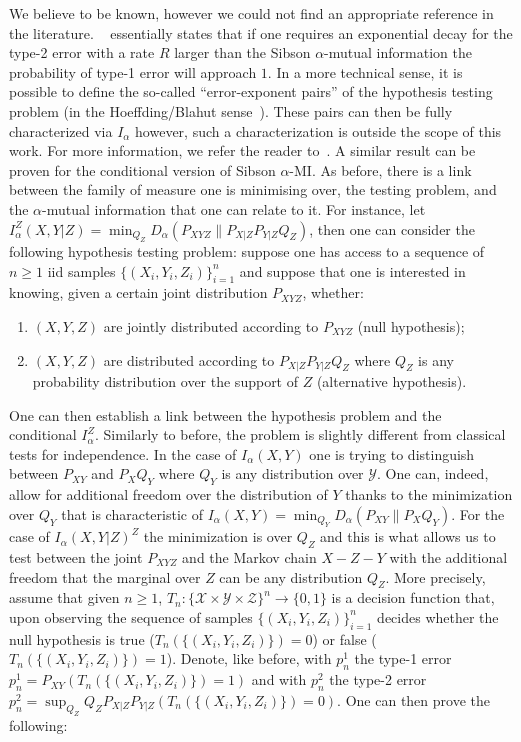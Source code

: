 \documentclass{article}
\numberwithin{theorem}{section}
\numberwithin{example}{section}
\numberwithin{remark}{section}
\numberwithin{definition}{section}
\newcommand{\revised}[1]{{\color{black} #1}}
\begin{document}
\revised{We believe  to be known, however we could not find an appropriate reference in the literature.}
~ essentially states that if one requires an exponential decay for the type-2 error with a rate $R$ larger than the Sibson $\alpha$-mutual information the probability of type-1 error will approach $1$. In a more technical sense, it is possible to define the so-called ``error-exponent pairs'' of the hypothesis testing problem (in the Hoeffding/Blahut sense~\cite{Hoeffding:65,Blahut:74}). These pairs can then be fully characterized via $I_\alpha$ however, such a characterization is outside the scope of this work. For more information, we refer the reader to~\cite{TomamichelH:18,LapidothP:18}. \iffalse A similar result can be proven for the conditional version of Sibson $\alpha$-MI. As before, there is a link between the family of measure one is minimising over, the testing problem, and the $\alpha$-mutual information that one can relate to it.
For instance, let $I_\alpha^Z(X,Y|Z)=\min_{Q_Z}D_\alpha(P_{XYZ}\|P_{X|Z}P_{Y|Z}Q_Z)$, then one can consider the following hypothesis testing problem:
suppose one has access to a sequence of $n\geq 1$ iid samples $\{(X_i,Y_i,Z_i)\}_{i=1}^n$ and suppose that one is interested in knowing, given a certain joint distribution $P_{XYZ}$, whether:
\begin{enumerate}
    \item $(X,Y,Z)$ are jointly distributed according to $P_{XYZ}$ (null hypothesis);
    \item $(X,Y,Z)$ are distributed according to $P_{X|Z}P_{Y|Z}Q_Z$ where $Q_Z$ is any probability distribution over the support of $Z$ (alternative hypothesis).
\end{enumerate}
One can then establish
a link between the hypothesis problem and the conditional $I_\alpha^Z$. Similarly to before, the problem is slightly different from classical tests for independence. In the case of $I_\alpha(X,Y)$ one is trying to distinguish between $P_{XY}$ and $P_XQ_Y$ where $Q_Y$ is any distribution over $\mathcal{Y}$. One can, indeed, allow for additional freedom over the distribution of $Y$ thanks to the minimization over $Q_Y$ that is characteristic of $I_\alpha(X,Y)=\min_{Q_Y}D_{\alpha}(P_{XY}\|P_XQ_Y)$. For the case of $I_\alpha(X,Y|Z)^Z$ the minimization is over $Q_Z$ and this is what allows us to test between the joint $P_{XYZ}$ and the Markov chain $X-Z-Y$ with the additional freedom that the marginal over $Z$ can be any distribution  $Q_Z$. More precisely, assume that given $n\geq 1$, $T_n :\{ \mathcal{X}\times\mathcal{Y}\times\mathcal{Z}\}^n\to\{0,1\}$ is a decision function that, upon observing the sequence of samples  $\{(X_i,Y_i,Z_i)\}_{i=1}^n$ decides whether the null hypothesis is true ($T_n(\{(X_i,Y_i,Z_i)\})=0$) or false ($T_n(\{(X_i,Y_i,Z_i)\})=1$). Denote, like before, with $p_n^1$ the type-1 error $p_n^1 = P_{XY}(T_n(\{(X_i,Y_i,Z_i)\})=1)$ and with $p_n^2$ the type-2 error $p_n^2 = \sup_{Q_Z} Q_ZP_{X|Z}P_{Y|Z}(T_n(\{(X_i,Y_i,Z_i)\})=0)$. One can then prove the following: 
\end{document}

